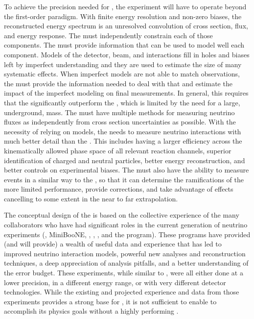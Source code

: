To achieve the precision needed for , the experiment will have to operate beyond the first-order paradigm. With finite energy resolution and non-zero biases, the reconstructed energy spectrum is an unresolved convolution of cross section, flux, and energy response. The  must independently constrain each of those components.  The  must provide information that can be used to model well each component. Models of the detector, beam, and interactions fill in holes and biases left by imperfect understanding and they are used to estimate the size of many systematic effects.  When imperfect models are not able to match observations, the  must provide the information needed to deal with that and estimate the impact of the imperfect modeling on final measurements. In general, this requires that the  significantly outperform the , which is limited by the need for a large, underground, mass. The  must have multiple methods for measuring neutrino fluxes as independently from cross section uncertainties as possible. With the necessity of relying on models, the  needs to measure neutrino interactions with much better detail than the . This includes having a larger efficiency across the kinematically allowed phase space of all relevant reaction channels, superior identification of charged and neutral particles, better energy reconstruction, and better controls on experimental biases. The  must also have the ability to measure events in a similar way to the , so that it can determine the ramifications of the more limited  performance, provide corrections, and take advantage of effects cancelling to some extent in the near to far extrapolation.

The conceptual design of the  is based on the collective experience of the many  collaborators who have had significant roles in the current generation of neutrino experiments (, MiniBooNE, , , , and the  program).  These programs have provided (and will provide) a wealth of useful data and experience that has led to improved neutrino interaction models, powerful new analyses and reconstruction techniques, a deep appreciation of analysis pitfalls, and a better understanding of the error budget. 
These experiments, while similar to , were all either done at a lower precision, in a different energy range, or with very different detector technologies. While the existing and projected experience and data from those experiments provides a strong base for , it is not sufficient to enable  to accomplish its physics goals without a highly performing .  

